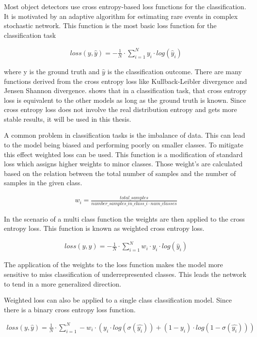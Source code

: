 \documentclass[
a4paper, 
12pt,
grayscalebody, %
abstract=on,
twoside, BCOR10mm, 12pt, DIV13,headinclude, footexclude, final, abstracton, openright
]{ibireprt}
\numberwithin{equation}{chapter}
\numberwithin{table}{chapter}
\numberwithin{figure}{chapter}
\numberwithin{algorithm}{chapter}
\numberwithin{example}{chapter}
\numberwithin{example}{chapter}
\begin{document}
Most object detectors use cross entropy-based loss functions for the classification. It is motivated by an adaptive algorithm for estimating rare events in complex stochastic network. This function is the most basic loss function for the classification task 
 
\begin{align}
loss(y,\hat{y}) = - \frac{1}{N} \cdot \sum_{i=1}^{N}y_i \cdot log(\hat{y}_i)
\end{align}

where y is the ground truth and $\hat{y}$ is the classification outcome. There are many functions derived from the cross entropy loss like Kullback-Leibler divergence and Jensen Shannon divergence. \cite{Tian2022} shows that in a classification task, that cross entropy loss is equivalent to the other models as long as the ground truth is known. Since cross entropy loss does not involve the real distribution entropy and gets more stable results, it will be used in this thesis. 

A common problem in classification tasks is the imbalance of data. This can lead to the model being biased and performing poorly on smaller classes. To mitigate this effect weighted loss can be used. This function is a modification of standard loss which assigns higher weights to minor classes. Those weight's are calculated based on the relation between the total number of samples and the number of samples in the given class. 

\begin{align}
	w_i = \frac{total\_samples}{number\_samples\_in\_class\_i \cdot num\_classes}
\end{align}

In the scenario of a multi class function the weights are then applied to the cross entropy loss. This function is known as weighted cross entropy loss. 

\begin{align}
	loss(y,\hat{y})= -	\frac{1}{N}\cdot \sum_{i=1}^{N} w_i \cdot y_i \cdot log(\hat{y}_i)
\end{align}

The application of the weights to the loss function makes the model more sensitive to miss classification of underrepresented classes. This leads the network to tend in a more generalized direction.

Weighted loss can also be applied to a single class classification model. Since there is a binary cross entropy loss function.

\begin{align}
	loss(y,\hat{y})=\frac{1}{N}\cdot\sum_{i=1}^{N} -w_i \cdot (y_i \cdot log(\sigma(\hat{y_i}))+(1-y_i)\cdot log(1-\sigma(\hat{y_i})) )
\end{align}
\end{document}

